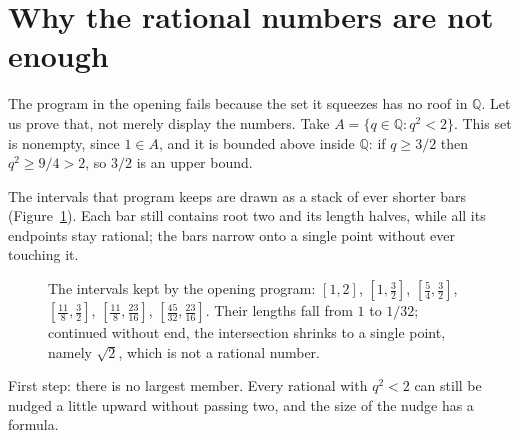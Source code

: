 \section{Why the rational numbers are not enough}

The program in the opening fails because the set it squeezes has no roof in
$\mathbb{Q}$. Let us prove that, not merely display the numbers. Take
$A=\{q\in\mathbb{Q}: q^2<2\}$. This set is nonempty, since $1\in A$, and it is bounded
above inside $\mathbb{Q}$: if $q\ge 3/2$ then $q^2\ge 9/4>2$, so $3/2$ is an upper
bound.

The intervals that program keeps are drawn as a stack of ever shorter bars
(Figure~\ref{fig:selang-bersarang}). Each bar still contains root two and its length
halves, while all its endpoints stay rational; the bars narrow onto a single point
without ever touching it.

\begin{figure}[htbp]
\centering
{}
\caption{The intervals kept by the opening program: $[1,2]$, $[1,\tfrac32]$,
$[\tfrac54,\tfrac32]$, $[\tfrac{11}{8},\tfrac32]$, $[\tfrac{11}{8},\tfrac{23}{16}]$,
$[\tfrac{45}{32},\tfrac{23}{16}]$. Their lengths fall from $1$ to $1/32$; continued
without end, the intersection shrinks to a single point, namely $\sqrt2$, which is not
a rational number.}
\label{fig:selang-bersarang}
\end{figure}

First step: there is no largest member. Every rational with $q^2<2$ can still be nudged
a little upward without passing two, and the size of the nudge has a formula.

